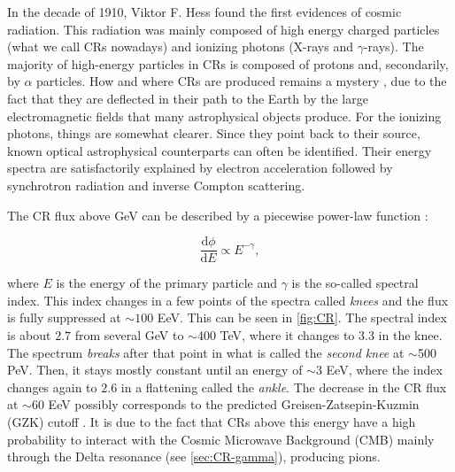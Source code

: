 In the decade of 1910, Viktor F. Hess \cite{Hess1912} found the first evidences of cosmic radiation. This radiation was mainly composed of high energy charged particles (what we call CRs nowadays) and ionizing photons (X-rays and $\gamma$-rays). The majority of high-energy particles in CRs is composed of protons and, secondarily, by $\alpha$ particles. How and where CRs are produced remains a mystery \cite{Agus}, due to the fact that they are deflected in their path to the Earth by the large electromagnetic fields that many astrophysical objects produce. For the ionizing photons, things are somewhat clearer. Since they point back to their source, known optical astrophysical counterparts can often be identified. Their energy spectra are satisfactorily explained by electron acceleration followed by synchrotron radiation and inverse Compton scattering.%

The CR flux above GeV can be described by a piecewise power-law function \cite{energy_spec}:

\begin{equation}
\frac{\mathrm{d}\phi}{\mathrm{d}E} \propto E^{-\gamma},
\end{equation}

where $E$ is the energy of the primary particle and $\gamma$ is the so-called spectral index. This index changes in a few points of the spectra called \textit{knees} and the flux is fully suppressed at $\sim 100$ EeV. This can be seen in \autoref{fig:CR}. The spectral index is about $2.7$ from several GeV to $\sim$400 TeV, where it changes to $3.3$ in the knee. The spectrum \textit{breaks} after that point in what is called the \textit{second knee} at $\sim$500 PeV. Then, it stays mostly constant until an energy of $\sim$3 EeV, where the index changes again to $2.6$ in a flattening called the \textit{ankle}. The decrease in the CR flux at $\sim$60 EeV possibly corresponds to the predicted Greisen-Zatsepin-Kuzmin (GZK) cutoff \cite{GZK}. It is due to the fact that CRs above this energy have a high probability to interact with the Cosmic Microwave Background (CMB) mainly through the Delta resonance (see \autoref{sec:CR-gamma}), producing pions.


